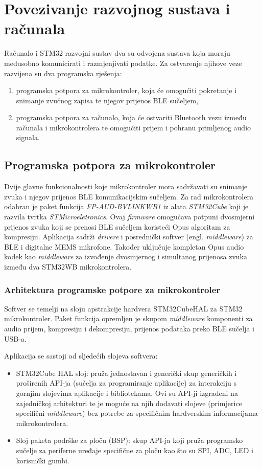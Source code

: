 \chapter{Povezivanje razvojnog sustava i računala}

Računalo i STM32 razvojni sustav dva su odvojena sustava koja moraju međusobno komunicirati i razmjenjivati podatke. Za ostvarenje njihove veze razvijena su dva programska rješenja:
\begin{enumerate}
	\item programska potpora za mikrokontroler, koja će omogućiti pokretanje i snimanje zvučnog zapisa te njegov prijenos BLE sučeljem,
	\item programska potpora za računalo, koja će ostvariti Bluetooth vezu između računala i mikrokontrolera te omogućiti prijem i pohranu primljenog audio signala.
\end{enumerate} 

\section{Programska potpora za mikrokontroler}

Dvije glavne funkcionalnosti koje mikrokontroler mora sadržavati su snimanje zvuka i njegov prijenos BLE komunikacijskim sučeljem. Za rad mikrokontrolera odabran je paket funkcija \textit{FP-AUD-BVLINKWB1} iz alata \textit{STM32Cube} koji je razvila tvrtka \textit{STMicroeletronics}. Ovaj \textit{firmware} omogućava potpuni dvosmjerni prijenos zvuka koji se prenosi BLE sučeljem koristeći Opus algoritam za kompresiju. Aplikacija sadrži \textit{drivere} i posrednički softver (engl. \textit{middleware}) za BLE i digitalne MEMS mikrofone. Također uključuje kompletan Opus audio kodek kao \textit{middleware} za izvođenje dvosmjernog i simultanog prijenosa zvuka između dva STM32WB mikrokontrolera.

\subsection{Arhitektura programske potpore za mikrokontroler}

Softver se temelji na sloju apstrakcije hardvera STM32CubeHAL za STM32 mikrokontroler. Paket funkcija opremljen je skupom \textit{middleware} komponenti za audio prijem, kompresiju i
dekompresiju, prijenos podataka preko BLE sučelja i USB-a.

Aplikacija se sastoji od sljedećih slojeva softvera:
\begin{itemize}
	\item STM32Cube HAL sloj: pruža jednostavan i generički skup generičkih i proširenih API-ja (sučelja za programiranje aplikacije) za interakciju s gornjim slojevima aplikacije i bibliotekama. Ovi su API-ji izgrađeni na zajedničkoj arhitekturi te je moguće na njih dodavati slojeve (primjerice specifični \textit{middleware}) bez potrebe za specifičnim hardverskim informacijama mikrokontrolera.
	\item Sloj paketa podrške za ploču (BSP): skup API-ja koji pruža programsko sučelje za periferne uređaje specifične za ploču kao što su SPI, ADC, LED i korisnički gumbi.
\end{itemize}

